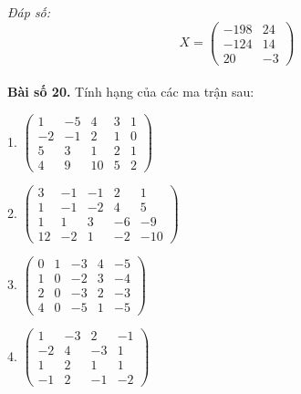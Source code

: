         \textit{Đáp số:}
        \[
        X = \begin{pmatrix}
        -198 & 24 \\
        -124 & 14 \\
        20 & -3
        \end{pmatrix}
        \]\\
\textbf{Bài số 20.} Tính hạng của các ma trận sau:
        
        1.
        \(
        \begin{pmatrix}
        1 & -5 & 4 & 3 & 1 \\
        -2 & -1 & 2 & 1 & 0 \\
        5 & 3 & 1 & 2 & 1 \\
        4 & 9 & 10 & 5 & 2
        \end{pmatrix}
        \)\\
        \vspace*{0.5cm}

        
        2.
        \(
        \begin{pmatrix}
        3 & -1 & -1 & 2 & 1 \\
        1 & -1 & -2 & 4 & 5 \\
        1 & 1 & 3 & -6 & -9 \\
        12 & -2 & 1 & -2 & -10
        \end{pmatrix}
        \)\\
        \vspace*{0.5cm}

        
        3.
        \(
        \begin{pmatrix}
        0 & 1 & -3 & 4 & -5 \\
        1 & 0 & -2 & 3 & -4 \\
        2 & 0 & -3 & 2 & -3 \\
        4 & 0 & -5 & 1 & -5
        \end{pmatrix}
        \)\\
        \vspace*{0.5cm}

        4.
        \(
        \begin{pmatrix}
        1 & -3 & 2 & -1 \\
        -2 & 4 & -3 & 1 \\
        1 & 2 & 1 & 1 \\
        -1 & 2 & -1 & -2
        \end{pmatrix}
        \)\\
        \vspace*{0.5cm}

